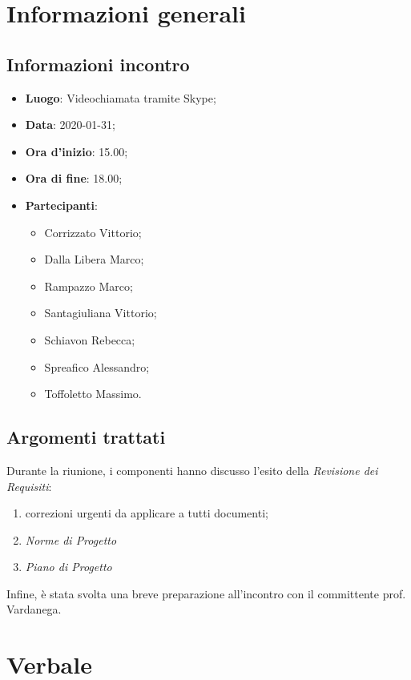 \section{Informazioni generali}
    \subsection{Informazioni incontro}
        \begin{itemize}
            \item \textbf{Luogo}: Videochiamata tramite Skype;
            \item \textbf{Data}: 2020-01-31;
            \item \textbf{Ora d'inizio}: 15.00;
            \item \textbf{Ora di fine}: 18.00;
            \item \textbf{Partecipanti}: \begin{itemize}
                \item Corrizzato Vittorio;
                \item Dalla Libera Marco;
                \item Rampazzo Marco;
                \item Santagiuliana Vittorio;
                \item Schiavon Rebecca;
                \item Spreafico Alessandro;
                \item Toffoletto Massimo.
            \end{itemize}
        \end{itemize}
    \subsection{Argomenti trattati}
        Durante la riunione, i componenti hanno discusso l'esito della \textit{Revisione dei Requisiti}:
        \begin{enumerate}
            \item correzioni urgenti da applicare a tutti documenti; %
            \item \textit{Norme di Progetto}
            \item \textit{Piano di Progetto}
        \end{enumerate}
        Infine, è stata svolta una breve preparazione all'incontro con il committente prof. Vardanega.
\section{Verbale}
